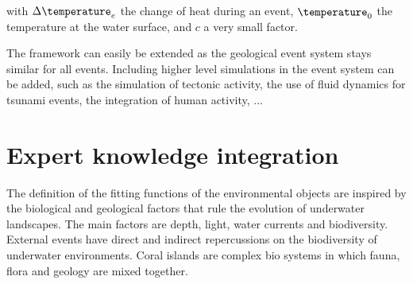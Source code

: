 with $\Delta \temperature_e$ the change of heat during an event, $\temperature_0$ the temperature at the water surface, and $c$ a very small factor.

The framework can easily be extended as the geological event system stays similar for all events. Including higher level simulations in the event system can be added, such as the simulation of tectonic activity, the use of fluid dynamics for tsunami events, the integration of human activity, ...

\section{Expert knowledge integration}
\label{sec:semantic-representation_biology}
  The definition of the fitting functions of the environmental objects are inspired by the biological and geological factors that rule the evolution of underwater landscapes. The main factors are depth, light, water currents and biodiversity. External events have direct and indirect repercussions on the biodiversity of underwater environments. Coral islands are complex bio systems in which fauna, flora and geology are mixed together. 

